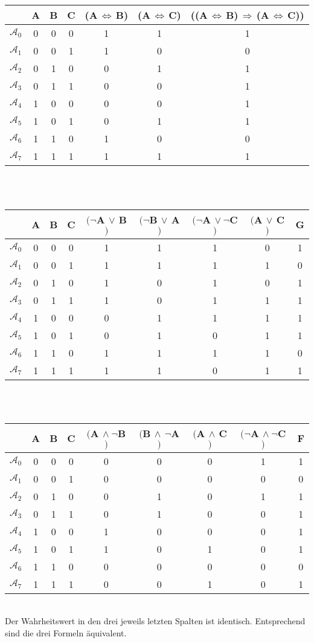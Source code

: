 \documentclass[10pt,a4paper,oneside,ngerman,numbers=noenddot]{scrartcl}
\begin{document}
\subsection{} %
\begin{tabular}{c|ccc|ccc}
 & A & B & C & (A$\, \Leftrightarrow \,$B) & (A$\, \Leftrightarrow \,$C) & ((A$\, \Leftrightarrow \,$B)$\, \Rightarrow \,$(A$\, \Leftrightarrow \,$C)) \\
\hline
$\mathcal{A}_{0}$ & 0 & 0 & 0 & 1 & 1 & 1 \\
$\mathcal{A}_{1}$ & 0 & 0 & 1 & 1 & 0 & 0 \\
$\mathcal{A}_{2}$ & 0 & 1 & 0 & 0 & 1 & 1 \\
$\mathcal{A}_{3}$ & 0 & 1 & 1 & 0 & 0 & 1 \\
$\mathcal{A}_{4}$ & 1 & 0 & 0 & 0 & 0 & 1 \\
$\mathcal{A}_{5}$ & 1 & 0 & 1 & 0 & 1 & 1 \\
$\mathcal{A}_{6}$ & 1 & 1 & 0 & 1 & 0 & 0 \\
$\mathcal{A}_{7}$ & 1 & 1 & 1 & 1 & 1 & 1
\end{tabular}\\
\\
\begin{tabular}{c|ccc|ccccc}
 & A & B & C & $(\neg$A$\, \vee \,$B$)$ & $(\neg$B$\, \vee \,$A$)$ & $(\neg$A$\, \vee \neg$C$)$ & $($A$\, \vee \,$C$)$ & G \\
\hline
$\mathcal{A}_{0}$ & 0 & 0 & 0 & 1 & 1 & 1 & 0 & 1 \\
$\mathcal{A}_{1}$ & 0 & 0 & 1 & 1 & 1 & 1 & 1 & 0 \\
$\mathcal{A}_{2}$ & 0 & 1 & 0 & 1 & 0 & 1 & 0 & 1 \\
$\mathcal{A}_{3}$ & 0 & 1 & 1 & 1 & 0 & 1 & 1 & 1 \\
$\mathcal{A}_{4}$ & 1 & 0 & 0 & 0 & 1 & 1 & 1 & 1 \\
$\mathcal{A}_{5}$ & 1 & 0 & 1 & 0 & 1 & 0 & 1 & 1 \\
$\mathcal{A}_{6}$ & 1 & 1 & 0 & 1 & 1 & 1 & 1 & 0 \\
$\mathcal{A}_{7}$ & 1 & 1 & 1 & 1 & 1 & 0 & 1 & 1 
\end{tabular}\\
\\
\begin{tabular}{c|ccc|ccccc}
 & A & B & C & $($A$\, \wedge \neg$B$)$ & $($B$\, \wedge \, \neg$A$)$ & $($A$\, \wedge \,$C$)$ & $(\neg$A$\, \wedge \neg$C$)$ & F \\
\hline
$\mathcal{A}_{0}$ & 0 & 0 & 0 & 0 & 0 & 0 & 1 & 1 \\
$\mathcal{A}_{1}$ & 0 & 0 & 1 & 0 & 0 & 0 & 0 & 0 \\
$\mathcal{A}_{2}$ & 0 & 1 & 0 & 0 & 1 & 0 & 1 & 1 \\
$\mathcal{A}_{3}$ & 0 & 1 & 1 & 0 & 1 & 0 & 0 & 1 \\
$\mathcal{A}_{4}$ & 1 & 0 & 0 & 1 & 0 & 0 & 0 & 1 \\
$\mathcal{A}_{5}$ & 1 & 0 & 1 & 1 & 0 & 1 & 0 & 1 \\
$\mathcal{A}_{6}$ & 1 & 1 & 0 & 0 & 0 & 0 & 0 & 0 \\
$\mathcal{A}_{7}$ & 1 & 1 & 1 & 0 & 0 & 1 & 0 & 1 
\end{tabular}\\
Der Wahrheitswert in den drei jeweils letzten Spalten ist identisch. Entsprechend sind die drei Formeln äquivalent.
\subsection{} %
\end{document}
